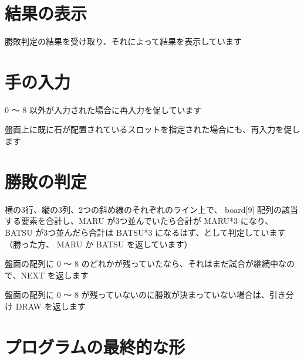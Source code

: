 \documentclass[uplatex,a4paper,11pt,oneside,openany]{jsbook}
\begin{document}


\section{結果の表示}

勝敗判定の結果を受け取り、それによって結果を表示しています



\section{手の入力}

0 〜 8 以外が入力された場合に再入力を促しています

盤面上に既に石が配置されているスロットを指定された場合にも、再入力を促します



\section{勝敗の判定}

横の3行、縦の3列、2つの斜め線のそれぞれのライン上で、 board[9] 配列の該当する要素を合計し、MARU が3つ並んでいたら合計が MARU*3 になり、
BATSU が3つ並んだら合計は BATSU*3 になるはず、として判定しています（勝った方、 MARU か BATSU を返しています）

盤面の配列に 0 〜 8 のどれかが残っていたなら、それはまだ試合が継続中なので、NEXT を返します

盤面の配列に 0 〜 8 が残っていないのに勝敗が決まっていない場合は、引き分け DRAW を返します



\section{プログラムの最終的な形}



%
%
\begin{thebibliography}{99}
\end{thebibliography}
%
\end{document}
